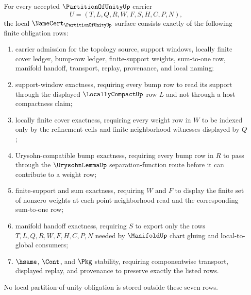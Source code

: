 \begin{theorem}
\label{thm:partition-of-unity-namecert-obligations}
For every accepted $\PartitionOfUnityUp$ carrier
$$
U=(T,L,Q,R,W,F,S,H,C,P,N),
$$
the local $\NameCert_{\PartitionOfUnityUp}$ surface consists exactly of the following finite obligation rows:
\begin{enumerate}
\item carrier admission for the topology source, support windows, locally finite cover ledger, bump-row ledger, finite-support weights, sum-to-one row, manifold handoff, transport, replay, provenance, and local naming;
\item support-window exactness, requiring every bump row to read its support through the displayed $\LocallyCompactUp$ row $L$ and not through a host compactness claim;
\item locally finite cover exactness, requiring every weight row in $W$ to be indexed only by the refinement cells and finite neighborhood witnesses displayed by $Q$;
\item Urysohn-compatible bump exactness, requiring every bump row in $R$ to pass through the $\UrysohnLemmaUp$ separation-function route before it can contribute to a weight row;
\item finite-support and sum exactness, requiring $W$ and $F$ to display the finite set of nonzero weights at each point-neighborhood read and the corresponding sum-to-one row;
\item manifold handoff exactness, requiring $S$ to export only the rows $T,L,Q,R,W,F,H,C,P,N$ needed by $\ManifoldUp$ chart gluing and local-to-global consumers;
\item $\hsame$, $\Cont$, and $\Pkg$ stability, requiring componentwise transport, displayed replay, and provenance to preserve exactly the listed rows.
\end{enumerate}
No local partition-of-unity obligation is stored outside these seven rows.
\end{theorem}
